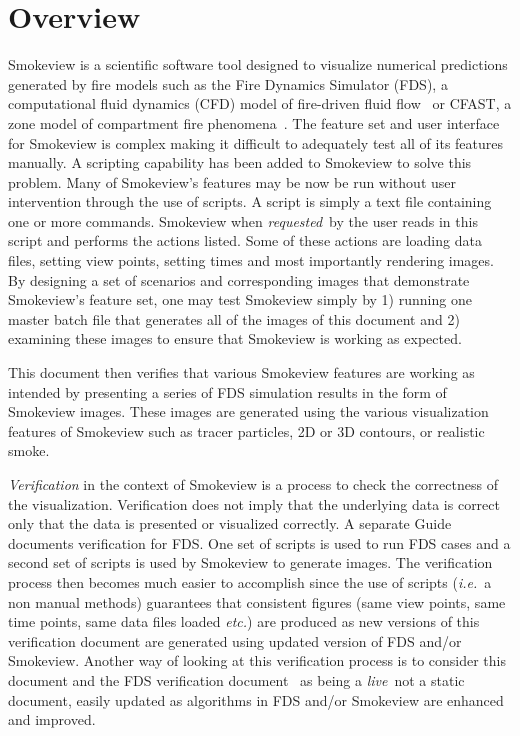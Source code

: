 \documentclass[11pt,twoside]{book}
\begin{document}
\chapter{Overview}
Smokeview is a scientific software tool designed to visualize numerical
predictions generated by fire models such as the Fire Dynamics Simulator (FDS),
a computational fluid dynamics (CFD) model of fire-driven fluid
flow~\cite{FDS_Tech_Guide_5} or CFAST, a zone model of compartment fire phenomena~\cite{Jones:2004A}.
The feature set and user interface for Smokeview is complex making it difficult to adequately test all of its features manually.  A scripting capability has been added to Smokeview to solve this problem.  Many of Smokeview's features may be now be run without user intervention through the use of scripts.  A script is simply a text file containing one or more commands.  Smokeview when {\em requested}\ by the user reads in this script and performs the actions listed.  Some of these actions are loading data files, setting view points, setting times and most importantly rendering images.  By designing a set of scenarios and corresponding images that demonstrate Smokeview's feature set, one may test Smokeview simply by 1) running one master batch file that generates all of the images of this document and 2) examining these images to ensure that Smokeview is working as expected.

This document then verifies that various Smokeview features are working as intended by presenting a series of  FDS simulation results in the form of Smokeview images.  These images are generated using the various visualization features of Smokeview such as tracer particles, 2D or 3D contours, or realistic smoke.

{\em Verification} in the context of Smokeview is a process to check the correctness
of the visualization.  Verification does not imply that the underlying data is correct only
that the data is presented or visualized correctly.
A separate Guide~\cite{FDS_Verification_Guide_5} documents verification for FDS.  One set of scripts is used to run FDS cases and a second set of scripts is used by Smokeview to generate images.  The verification process then becomes much easier to accomplish since the use of scripts ({\em i.e.}\ a non manual methods) guarantees that consistent figures (same view points, same time points, same data files loaded {\em etc.}) are produced as new versions of this verification document are generated using updated version of FDS and/or Smokeview.  Another way of looking at this verification process is to
consider this document and the FDS verification document~\cite{FDS_Verification_Guide_5} as being a {\em live}\ not a static document, easily updated as algorithms in FDS and/or Smokeview are enhanced and improved.
\end{document}
